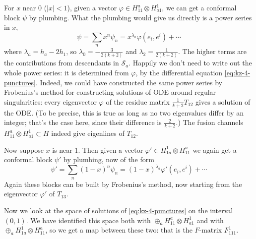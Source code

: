 \documentclass[12pt,letterpaper,reqno]{amsart}
\numberwithin{equation}{section}
\newcommand{\cS}{\ensuremath{\mathcal S}}
\newcommand{\abs}[1]{\lvert#1\rvert}
\begin{document}
\begin{example}
For $x$ near $0$ ($\abs{x}<1$), 
given a vector $\varphi \in H_{11}^a \otimes H_{a1}^1$,
we can get a conformal block $\psi$ by plumbing.
What the plumbing would give us directly is a power series in $x$,
\begin{equation}
 \psi = \sum_n x^n \psi_n = x^{\lambda_a} \varphi(e_i,e^i) + \cdots 
\end{equation}
where $\lambda_a = h_a - 2 h_1$, so $\lambda_0 = - \frac{3}{2(k+2)}$ and
$\lambda_2 = \frac{1}{2(k+2)}$.
The higher terms are the contributions from descendants in $\cS_a$.
Happily we don't need to write out the whole power series:
it is determined from $\varphi$, by the differential equation
\eqref{eq:kz-4-punctures}.
Indeed, we could have constructed the same power series by 
Frobenius's method for constructing
solutions of ODE around regular singularities: every eigenvector $\varphi$
of the residue matrix $\frac{1}{k+2} T_{12}$ gives a solution
of the ODE. (To be precise, this is true as long as no two eigenvalues
differ by an integer; that's the case here, since their difference is $\frac{2}{k+2}$.)
The fusion channels $H_{11}^a \otimes H_{a1}^1 \subset H$ 
indeed give eigenlines of $T_{12}$.

Now suppose $x$ is near $1$. Then given a vector
$\varphi' \in H_{1a}^1 \otimes H_{11}^a$ we again get a conformal
block $\psi'$ by plumbing, now of the form
\begin{equation}
 \psi' = \sum_n (1-x)^n \psi_n = (1-x)^{\lambda_a} \varphi'(e_i,e^i) + \cdots 
\end{equation}
Again these blocks can be built by Frobenius's method, now starting from 
the eigenvector $\varphi'$ of $T_{13}$.

Now we look at the space of solutions of \eqref{eq:kz-4-punctures}
on the interval $(0,1)$. We have identified this space 
both with $\oplus_a H_{11}^a \otimes H_{a1}^1$ and with 
$\oplus_a H_{1a}^1 \otimes H_{11}^a$, so we get a map between these two:
that is the $F$-matrix $F_{111}^1$.


\end{example}
\end{document}
